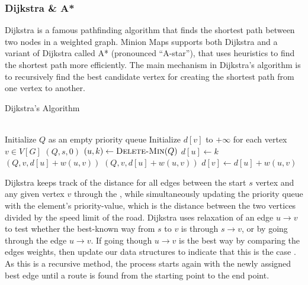 \subsubsection{Dijkstra \& A*}
Dijkstra is a famous pathfinding algorithm that finds the shortest path between two nodes in a weighted graph. Minion Maps supports both Dijkstra and a variant of Dijkstra called A* (pronounced “A-star”), that uses heuristics to find the shortest path more efficiently. The main mechanism in Dijkstra’s algorithm is to recursively find the best candidate vertex for creating the shortest path from one vertex to another.\cite{Dijkstra} \\
\newpage
\begin{algorithm}
\caption{Dijkstra's Algorithm\cite{Pathfinding/Code}}\label{dijkstra}
\begin{algorithmic}
\\
     
        \State Initialize $Q$ as an empty priority queue
        \State Initialize $d[v]$ to $+\infty$ for each vertex $v \in V[G]$
        \State {}$(Q, s, 0)$ 
            \State $(u, k) \gets \textproc{Delete-Min}(Q)$ 
            \State $d[u] \gets k$ 
             
                     \State {}$(Q, v, d[u] + w(u, v))$
                    \Else \State {}$(Q, v, d[u] + w(u, v))$
                    \EndIf
                    \State $d[v] \gets d[u] + w(u, v)$ 
                  \EndIf
            \EndFor
        \EndWhile
    \EndProcedure
\end{algorithmic}
\end{algorithm}
Dijkstra keeps track of the distance for all edges between the start $s$ vertex and any given vertex $v$ through the , while simultaneously updating the priority queue with the element's priority-value, which is the distance between the two vertices divided by the speed limit of the road. Dijkstra uses relaxation of an edge $u \rightarrow v$ to test whether the best-known way from $s$ to $v$ is through $s \rightarrow v$, or by going through the edge $u \rightarrow v$. If going though $u \rightarrow v$ is the best way by comparing the edges weights, then update our data structures to indicate that this is the case \cite{AlgoBook/652}. As this is a recursive method, the process starts again with the newly assigned best edge until a route is found from the starting point to the end point. 
